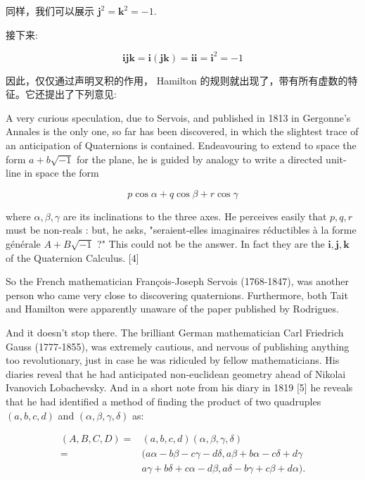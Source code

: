同样，我们可以展示 $\mathbf{j}^{2}=\mathbf{k}^{2}=-1$.

接下来:

$$
    \mathbf{i} \mathbf{j} \mathbf{k}=\mathbf{i}(\mathbf{j} \mathbf{k})=\mathbf{i} \mathbf{i}=\mathbf{i}^{2}=-1
$$

因此，仅仅通过声明叉积的作用， Hamilton 的规则就出现了，带有所有虚数的特征。它还提出了下列意见:


A very curious speculation, due to Servois, and published in 1813 in Gergonne's Annales is the only one, so far has been discovered, in which the slightest trace of an anticipation of Quaternions is contained. Endeavouring to extend to space the form $a+b \sqrt{-1}$ for the plane, he is guided by analogy to write a directed unit-line in space the form

$$
    p \cos \alpha+q \cos \beta+r \cos \gamma
$$

where $\alpha, \beta, \gamma$ are its inclinations to the three axes. He perceives easily that $p, q, r$ must be non-reals : but, he asks, "seraient-elles imaginaires réductibles à la forme générale $A+B \sqrt{-1}$ ?" This could not be the answer. In fact they are the $\mathbf{i}, \mathbf{j}, \mathbf{k}$ of the Quaternion Calculus. [4]

So the French mathematician François-Joseph Servois (1768-1847), was another person who came very close to discovering quaternions. Furthermore, both Tait and Hamilton were apparently unaware of the paper published by Rodrigues.

And it doesn't stop there. The brilliant German mathematician Carl Friedrich Gauss (1777-1855), was extremely cautious, and nervous of publishing anything too revolutionary, just in case he was ridiculed by fellow mathematicians. His diaries reveal that he had anticipated non-euclidean geometry ahead of Nikolai Ivanovich Lobachevsky. And in a short note from his diary in 1819 [5] he reveals that he had identified a method of finding the product of two quadruples $(a, b, c, d)$ and $(\alpha, \beta, \gamma, \delta)$ as:

$$
    \begin{aligned}
        (A, B, C, D)= & (a, b, c, d)(\alpha, \beta, \gamma, \delta)                               \\
        =             & (a \alpha-b \beta-c \gamma-d \delta, a \beta+b \alpha-c \delta+d \gamma   \\
                      & a \gamma+b \delta+c \alpha-d \beta, a \delta-b \gamma+c \beta+d \alpha) .
    \end{aligned}
$$

